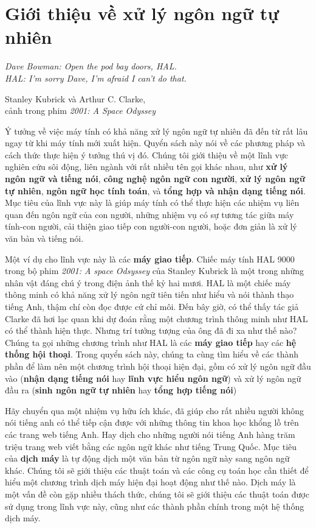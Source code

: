 \setcounter{chapter}{0}


\chapter{Giới thiệu về xử lý ngôn ngữ tự nhiên}

\setlength{}
\epigraphfontsize{\small}
\epigraph{
\itshape Dave Bowman: Open the pod bay doors, HAL.\\
HAL: I'm sorry Dave, I'm afraid I can't do that.\\
}{Stanley Kubrick và Arthur C. Clarke,\\
cảnh trong phim \textit{2001: A Space Odyssey}}

Ý tưởng về việc máy tính có khả năng xử lý ngôn ngữ tự nhiên đã đến từ rất lâu ngay từ khi máy tính mới xuất hiện. Quyển sách này nói về các phương pháp và cách thức thực hiện ý tưởng thú vị đó. Chúng tôi giới thiệu về một lĩnh vực nghiên cứu sôi động, liên ngành với rất nhiều tên gọi khác nhau, như \textbf{xử lý ngôn ngữ và tiếng nói}, \textbf{công nghệ ngôn ngữ con người}, \textbf{xử lý ngôn ngữ tự nhiên}, \textbf{ngôn ngữ học tính toán}, và \textbf{tổng hợp và nhận dạng tiếng nói}. Mục tiêu của lĩnh vực này là giúp máy tính có thể thực hiện các nhiệm vụ liên quan đến ngôn ngữ của con người, những nhiệm vụ có sự tương tác giữa máy tính-con người, cải thiện giao tiếp con người-con người, hoặc đơn giản là xử lý văn bản và tiếng nói.

Một ví dụ cho lĩnh vực này là các \textbf{máy giao tiếp}. Chiếc máy tính HAL 9000 trong bộ phim \textit{2001: A space Odsyssey} của Stanley Kubrick là một trong những nhân vật đáng chú ý trong điện ảnh thế kỷ hai mươi. HAL là một chiếc máy thông minh có khả năng xử lý ngôn ngữ tiên tiến như hiểu và nói thành thạo tiếng Anh, thậm chí còn đọc được cử chỉ môi. Đến bây giờ, có thể thấy tác giả Clarke đã hơi lạc quan khi dự đoán rằng một chương trình thông minh như HAL có thể thành hiện thực. Nhưng trí tưởng tượng của ông đã đi xa như thế nào? Chúng ta gọi những chương trình như HAL là các \textbf{máy giao tiếp} hay các \textbf{hệ thống hội thoại}. Trong quyển sách này, chúng ta cùng tìm hiểu về các thành phần để làm nên một chương trình hội thoại hiện đại, gồm có xử lý ngôn ngữ đầu vào (\textbf{nhận dạng tiếng nói} hay \textbf{lĩnh vực hiểu ngôn ngữ}) và xử lý ngôn ngữ đầu ra (\textbf{sinh ngôn ngữ tự nhiên} hay \textbf{tổng hợp tiếng nói})

Hãy chuyển qua một nhiệm vụ hữu ích khác, đã giúp cho rất nhiều người không nói tiếng anh có thể tiếp cận được với những thông tin khoa học khổng lồ trên các trang web tiếng Anh. Hay dịch cho những người nói tiếng Anh hàng trăm triệu trang web viết bằng các ngôn ngữ khác như tiếng Trung Quốc. Mục tiêu của \textbf{dịch máy} là tự động dịch một văn bản từ ngôn ngữ này sang ngôn ngữ khác. Chúng tôi sẽ giới thiệu các thuật toán và các công cụ toán học cần thiết để hiểu một chương trình dịch máy hiện đại hoạt động như thế nào. Dịch máy là một vấn đề còn gặp nhiều thách thức, chúng tôi sẽ giới thiệu các thuật toán được sử dụng trong lĩnh vực này, cũng như các thành phần chính trong một hệ thống dịch máy.

